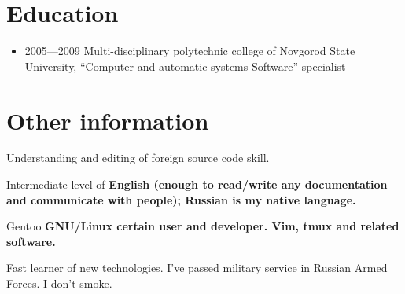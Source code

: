 \section{Education}
\begin{itemize}
\item 2005---2009 Multi-disciplinary polytechnic college of
Novgorod State University,
``Computer and automatic systems Software'' specialist
\end{itemize}

\section{Other information}
Understanding and editing of foreign source code skill.

Intermediate level of \bfseries English \mdseries
(enough to read/write any documentation and communicate with people);
Russian is my native language.

Gentoo \bfseries GNU/Linux \mdseries certain user and developer.
Vim, tmux and related software.

Fast learner of new technologies.
I've passed military service in Russian Armed Forces.
I don't smoke.
